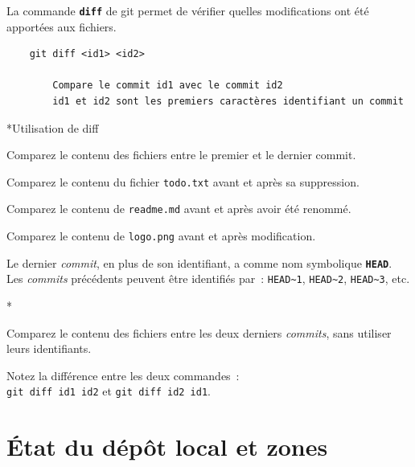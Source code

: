 \documentclass[a4paper,11pt]{style-esi/td}
\begin{document}
La commande \texttt{\textbf{diff}} de git permet de vérifier quelles modifications ont été apportées aux fichiers. 

\bigskip
\begin{colxbox}[colback=white,drop fuzzy shadow]
	\begin{verbatim}
	git diff <id1> <id2>

		Compare le commit id1 avec le commit id2
	    id1 et id2 sont les premiers caractères identifiant un commit
	\end{verbatim}
\end{colxbox}
\bigskip

\pagebreak[4]
\begin{Exercice}*{Utilisation de diff}
	\begin{steps}
	\item Comparez le contenu des fichiers entre le premier et le dernier commit.
	\item Comparez le contenu du fichier \texttt{todo.txt} avant et après sa 
		suppression.
	\item Comparez le contenu de \texttt{readme.md} avant et après avoir été 
		renommé.
	\item Comparez le contenu de \texttt{logo.png} avant et après modification. 
	\end{steps}
\end{Exercice}

Le dernier \textit{commit}, en plus de son identifiant, a comme nom symbolique \texttt{\textbf{HEAD}}. Les \textit{commits} précédents peuvent être identifiés par :
\texttt{HEAD\textasciitilde 1}, 
\texttt{HEAD\textasciitilde 2}, 
\texttt{HEAD\textasciitilde 3}, etc.

\begin{Exercice}*{}
	\begin{steps}
	\item Comparez le contenu des fichiers entre les deux derniers 
		\textit{commits}, sans utiliser leurs identifiants. 
	\item Notez la différence entre les deux commandes : \\
		\texttt{git diff id1 id2} et \texttt{git diff id2 id1}. 
	\end{steps}
\end{Exercice}





\section{État du dépôt local et zones}
\end{document}
